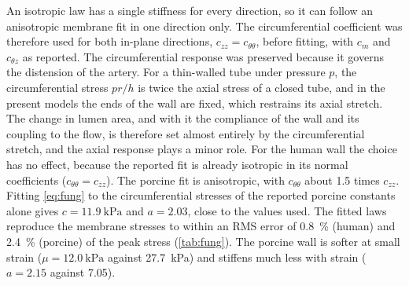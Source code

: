 An isotropic law has a single stiffness for every direction, so it can follow an anisotropic membrane fit in one direction only.
The circumferential coefficient was therefore used for both in-plane directions, $c_{zz} = c_{\theta\theta}$, before fitting, with $c_m$ and $c_{\theta z}$ as reported.
The circumferential response was preserved because it governs the distension of the artery.
For a thin-walled tube under pressure $p$, the circumferential stress $pr/h$ is twice the axial stress of a closed tube, and in the present models the ends of the wall are fixed, which restrains its axial stretch.
The change in lumen area, and with it the compliance of the wall and its coupling to the flow, is therefore set almost entirely by the circumferential stretch, and the axial response plays a minor role.
For the human wall the choice has no effect, because the reported fit is already isotropic in its normal coefficients ($c_{\theta\theta} = c_{zz}$).
The porcine fit is anisotropic, with $c_{\theta\theta}$ about 1.5 times $c_{zz}$.
Fitting \cref{eq:fung} to the circumferential stresses of the reported porcine constants alone gives $c = \SI{11.9}{\kilo\pascal}$ and $a = 2.03$, close to the values used.
The fitted laws reproduce the membrane stresses to within an RMS error of \SI{0.8}{\percent} (human) and \SI{2.4}{\percent} (porcine) of the peak stress (\cref{tab:fung}).
The porcine wall is softer at small strain ($\mu = \SI{12.0}{\kilo\pascal}$ against \SI{27.7}{\kilo\pascal}) and stiffens much less with strain ($a = 2.15$ against 7.05).

\begin{table}[tb]
  \centering
  \caption{Membrane Fung fits of supravalvular pulmonary artery tissue (\cref{eq:fung-membrane}) and the isotropic three-dimensional law fitted to them (\cref{eq:fung}). Before fitting, $c_{zz}$ was set to $c_{\theta\theta}$. RMS is the error in the membrane stresses, as a percentage of the peak stress. Membrane fits: human \citep{azadaniRegionalMechanicalProperties2012}, porcine \citep{matthews2010comparison}.}
  \label{tab:fung}
  \small
  
\end{table}


